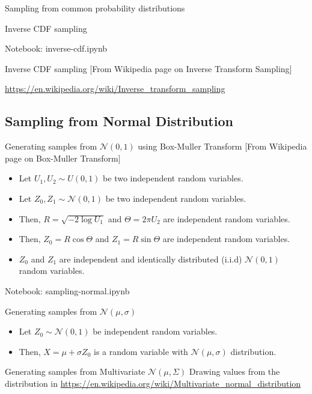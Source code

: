 \documentclass{beamer}
\begin{document}
\begin{section}{Sampling from common probability distributions}
\begin{frame}{Inverse CDF sampling}
    
\end{frame}

\begin{frame}
    Notebook: inverse-cdf.ipynb
\end{frame}

\begin{frame}{Inverse CDF sampling}
    [From Wikipedia page on Inverse Transform Sampling]

    \url{https://en.wikipedia.org/wiki/Inverse_transform_sampling}

\end{frame}

\subsection{Sampling from Normal Distribution}
\begin{frame}{Generating samples from $\mathcal{N}(0, 1)$ using Box-Muller Transform}
    [From Wikipedia page on Box-Muller Transform]
    \begin{itemize}
        \item Let $U_1, U_2 \sim U(0, 1)$ be two independent random variables.
        \item \pause Let $Z_0, Z_1 \sim \mathcal{N}(0, 1)$ be two independent random variables.
        \item \pause Then, $R = \sqrt{-2 \log U_1}$ and $\Theta = 2 \pi U_2$ are independent random variables.
        \item \pause Then, $Z_0 = R \cos \Theta$ and $Z_1 = R \sin \Theta$ are independent random variables.
        \item \pause $Z_0$ and $Z_1$ are independent and identically distributed (i.i.d) $\mathcal{N}(0, 1)$ random variables.
    \end{itemize}
    
\end{frame}

\begin{frame}
    Notebook: sampling-normal.ipynb
\end{frame}

\begin{frame}{Generating samples from $\mathcal{N}(\mu, \sigma)$}
    \begin{itemize}
        \item Let $Z_0 \sim \mathcal{N}(0, 1)$ be independent random variables.
        \item \pause Then, $X = \mu + \sigma Z_0$ is a random variable with $\mathcal{N}(\mu, \sigma)$ distribution.
    \end{itemize}
    
\end{frame}

\begin{frame}{Generating samples from Multivariate $\mathcal{N}(\mu, \Sigma)$}
    Drawing values from the distribution in \url{https://en.wikipedia.org/wiki/Multivariate_normal_distribution}
\end{frame}


    
\end{section}
\end{document}
